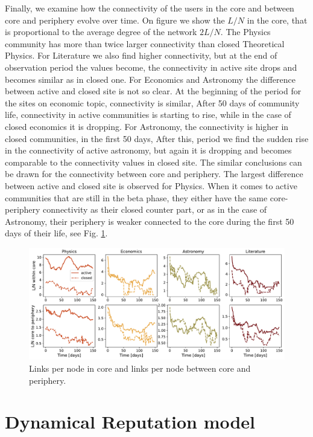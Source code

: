 Finally, we examine how the connectivity of the users in the core and between core and periphery evolve over time. On figure we show the $L/N$ in the core, that is proportional to the average degree of the network $2L/N$. The Physics community has more than twice larger connectivity than closed Theoretical Physics. For Literature we also find higher connectivity, but at the end of observation period the values become, the connectivity in active site drops and becomes similar as in closed one. For Economics and Astronomy the difference between active and closed site is not so clear. At the beginning of the period for the sites on economic topic, connectivity is similar, After 50 days of community life, connectivity in active communities is starting to rise, while in the case of closed economics it is dropping. For Astronomy, the connectivity is higher in closed communities, in the first 50 days, After this, period we find the sudden rise in the connectivity of active astronomy, but again it is dropping and becomes comparable to the connectivity values in closed site. The similar conclusions can be drawn for the connectivity between core and periphery. The largest difference between active and closed site is observed for Physics.  When it comes to active communities that are still in the beta phase, they either have the same core-periphery connectivity as their closed counter part, or as in the case of Astronomy, their periphery is weaker connected to the core during the first 50 days of their life, see Fig. \ref{fig:links_per_node}. 

\begin{figure}[h]
	\centering
	\includegraphics[width=\linewidth]{figures/stackexchange/core_connectivity.pdf}
	\caption{Links per node in core and links per node between core and periphery.}
	\label{fig:links_per_node}
\end{figure}

\section{Dynamical Reputation model}

